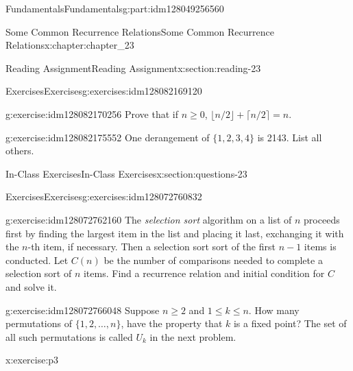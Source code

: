 \documentclass[oneside,10pt,]{book}
\numberwithin{equation}{section}
\begin{document}
\begin{partptx}{Fundamentals}{}{Fundamentals}{}{}{g:part:idm128049256560}
\begin{chapterptx}{Some Common Recurrence Relations}{}{Some Common Recurrence Relations}{}{}{x:chapter:chapter_23}
\begin{sectionptx}{Reading Assignment}{}{Reading Assignment}{}{}{x:section:reading-23}
\begin{exercises-subsection}{Exercises}{}{Exercises}{}{}{g:exercises:idm128082169120}
\par\medskip\noindent%
%
\begin{exercisegroup}
\begin{divisionexerciseeg}{1}{}{}{g:exercise:idm128082170256}%
Prove that if \(n \geq 0\), \(\lfloor n/2\rfloor +\lceil n/2\rceil = n\).%
\end{divisionexerciseeg}%
\begin{divisionexerciseeg}{2}{}{}{g:exercise:idm128082175552}%
One derangement of \(\{1,2,3,4\}\) is 2143.  List all others.%
\end{divisionexerciseeg}%
\end{exercisegroup}
\par\medskip\noindent
\end{exercises-subsection}
\end{sectionptx}
%
%
\typeout{************************************************}
\typeout{************************************************}
%
\begin{sectionptx}{In-Class Exercises}{}{In-Class Exercises}{}{}{x:section:questions-23}
%
%
%
\typeout{************************************************}
\typeout{************************************************}
%
\begin{exercises-subsection}{Exercises}{}{Exercises}{}{}{g:exercises:idm128072760832}
\par\medskip\noindent%
%
\begin{exercisegroup}
\begin{divisionexerciseeg}{1}{}{}{g:exercise:idm128072762160}%
The \emph{selection sort} algorithm on a list of \(n\) proceeds first by finding the largest item in the list and placing it last, exchanging it with the \(n\)-th item, if necessary.  Then a selection sort sort of the first \(n-1\) items is conducted. Let \(C(n)\) be the number of comparisons needed to complete a selection sort of \(n\) items.   Find a recurrence relation and initial condition for \(C\) and solve it.%
\end{divisionexerciseeg}%
\begin{divisionexerciseeg}{2}{}{}{g:exercise:idm128072766048}%
Suppose \(n \geq 2\) and \(1 \leq k \leq n\).  How many permutations of \(\{1,2, \dots ,n\}\),  have the property that \(k\) is a fixed point?  The set of all such permutations is called \(U_k\) in the next problem.%
\end{divisionexerciseeg}%
\begin{divisionexerciseeg}{3}{}{}{x:exercise:p3}%

\end{divisionexerciseeg}
\end{exercisegroup}
\end{exercises-subsection}
\end{sectionptx}
\end{chapterptx}
\end{partptx}
\end{document}
